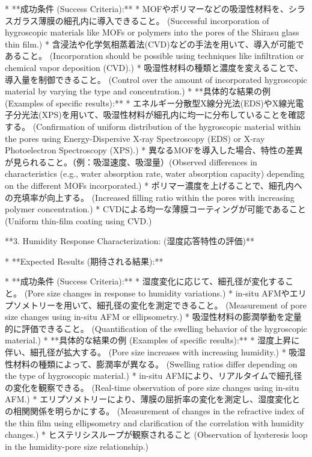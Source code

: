 \documentclass{article}
\begin{document}
    *   **成功条件 (Success Criteria):**
        *   MOFやポリマーなどの吸湿性材料を、シラスガラス薄膜の細孔内に導入できること。 (Successful incorporation of hygroscopic materials like MOFs or polymers into the pores of the Shirasu glass thin film.)
        *   含浸法や化学気相蒸着法(CVD)などの手法を用いて、導入が可能であること。 (Incorporation should be possible using techniques like infiltration or chemical vapor deposition (CVD).)
        *   吸湿性材料の種類と濃度を変えることで、導入量を制御できること。 (Control over the amount of incorporated hygroscopic material by varying the type and concentration.)
    *   **具体的な結果の例 (Examples of specific results):**
        *   エネルギー分散型X線分光法(EDS)やX線光電子分光法(XPS)を用いて、吸湿性材料が細孔内に均一に分布していることを確認する。 (Confirmation of uniform distribution of the hygroscopic material within the pores using Energy-Dispersive X-ray Spectroscopy (EDS) or X-ray Photoelectron Spectroscopy (XPS).)
        *   異なるMOFを導入した場合、特性の差異が見られること。（例：吸湿速度、吸湿量）(Observed differences in characteristics (e.g., water absorption rate, water absorption capacity) depending on the different MOFs incorporated.)
        *   ポリマー濃度を上げることで、細孔内への充填率が向上する。 (Increased filling ratio within the pores with increasing polymer concentration.)
        *   CVDによる均一な薄膜コーティングが可能であること (Uniform thin-film coating using CVD.)

**3. Humidity Response Characterization: (湿度応答特性の評価)**

*   **Expected Results (期待される結果):**

    *   **成功条件 (Success Criteria):**
        *   湿度変化に応じて、細孔径が変化すること。 (Pore size changes in response to humidity variations.)
        *   in-situ AFMやエリプソメトリーを用いて、細孔径の変化を測定できること。 (Measurement of pore size changes using in-situ AFM or ellipsometry.)
        *   吸湿性材料の膨潤挙動を定量的に評価できること。 (Quantification of the swelling behavior of the hygroscopic material.)
    *   **具体的な結果の例 (Examples of specific results):**
        *   湿度上昇に伴い、細孔径が拡大する。 (Pore size increases with increasing humidity.)
        *   吸湿性材料の種類によって、膨潤率が異なる。 (Swelling ratios differ depending on the type of hygroscopic material.)
        *   in-situ AFMにより、リアルタイムで細孔径の変化を観察できる。 (Real-time observation of pore size changes using in-situ AFM.)
        *   エリプソメトリーにより、薄膜の屈折率の変化を測定し、湿度変化との相関関係を明らかにする。 (Measurement of changes in the refractive index of the thin film using ellipsometry and clarification of the correlation with humidity changes.)
        *   ヒステリシスループが観察されること (Observation of hysteresis loop in the humidity-pore size relationship.)
\end{document}
